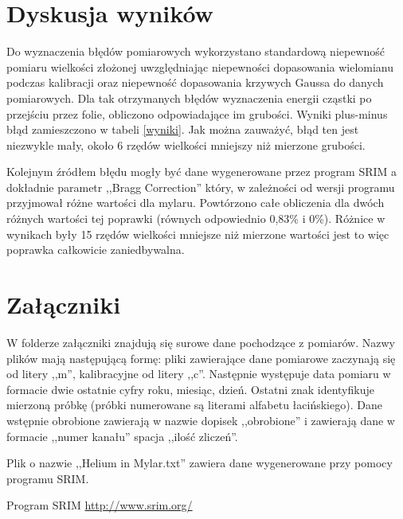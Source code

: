 \documentclass[12pt,a4paper]{article}
\begin{document}
\section{Dyskusja wyników}
Do wyznaczenia błędów pomiarowych wykorzystano standardową niepewność pomiaru wielkości złożonej uwzględniając niepewności dopasowania wielomianu podczas kalibracji oraz niepewność dopasowania krzywych Gaussa do danych pomiarowych. Dla tak otrzymanych błędów wyznaczenia energii cząstki po przejściu przez folie, obliczono odpowiadające im grubości. Wyniki plus-minus błąd zamieszczono w tabeli \ref{wyniki}. Jak można zauważyć, błąd ten jest niezwykle mały, około 6 rzędów wielkości mniejszy niż mierzone grubości.

Kolejnym źródłem błędu mogły być dane wygenerowane przez program SRIM a dokładnie parametr ,,Bragg Correction'' który, w zależności od wersji programu przyjmował różne wartości dla mylaru. Powtórzono całe obliczenia dla dwóch różnych wartości tej poprawki (równych odpowiednio 0,83\% i 0\%). Różnice w wynikach były 15 rzędów wielkości mniejsze niż mierzone wartości jest to więc poprawka całkowicie zaniedbywalna. 

\section{Załączniki}
W folderze załączniki znajdują się surowe dane pochodzące z pomiarów. Nazwy plików mają następującą formę: pliki zawierające dane pomiarowe zaczynają się od litery ,,m'', kalibracyjne od litery ,,c''. Następnie występuje data pomiaru w formacie dwie ostatnie cyfry roku, miesiąc, dzień. Ostatni znak identyfikuje mierzoną próbkę (próbki numerowane są literami alfabetu łacińskiego). Dane wstępnie obrobione zawierają w nazwie dopisek ,,\textunderscore obrobione'' i zawierają dane w formacie ,,numer kanału'' spacja ,,ilość zliczeń''.

Plik o nazwie ,,Helium in Mylar.txt'' zawiera dane wygenerowane przy pomocy programu SRIM. 

\begin{thebibliography}{9}
Program SRIM
\url{http://www.srim.org/}
\end{thebibliography}
\end{document}
